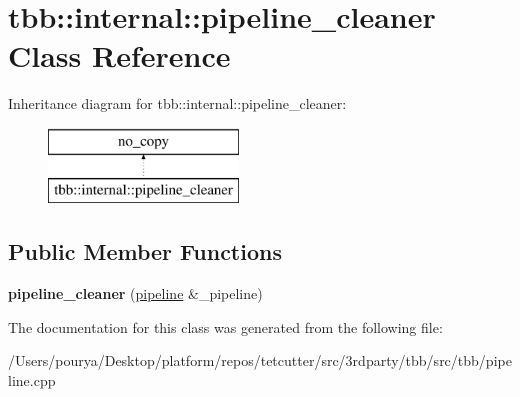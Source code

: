 \hypertarget{classtbb_1_1internal_1_1pipeline__cleaner}{}\section{tbb\+:\+:internal\+:\+:pipeline\+\_\+cleaner Class Reference}
\label{classtbb_1_1internal_1_1pipeline__cleaner}
Inheritance diagram for tbb\+:\+:internal\+:\+:pipeline\+\_\+cleaner\+:\begin{figure}[H]
\begin{center}
\leavevmode
\includegraphics[height=2.000000cm]{classtbb_1_1internal_1_1pipeline__cleaner}
\end{center}
\end{figure}
\subsection*{Public Member Functions}
\begin{DoxyCompactItemize}
\item 
\hypertarget{classtbb_1_1internal_1_1pipeline__cleaner_a7c3719b7f3e8a8eea8499b2122f1fa4a}{}{\bfseries pipeline\+\_\+cleaner} (\hyperlink{classtbb_1_1pipeline}{pipeline} \&\+\_\+pipeline)\label{classtbb_1_1internal_1_1pipeline__cleaner_a7c3719b7f3e8a8eea8499b2122f1fa4a}

\end{DoxyCompactItemize}


The documentation for this class was generated from the following file\+:\begin{DoxyCompactItemize}
\item 
/\+Users/pourya/\+Desktop/platform/repos/tetcutter/src/3rdparty/tbb/src/tbb/pipeline.\+cpp\end{DoxyCompactItemize}
